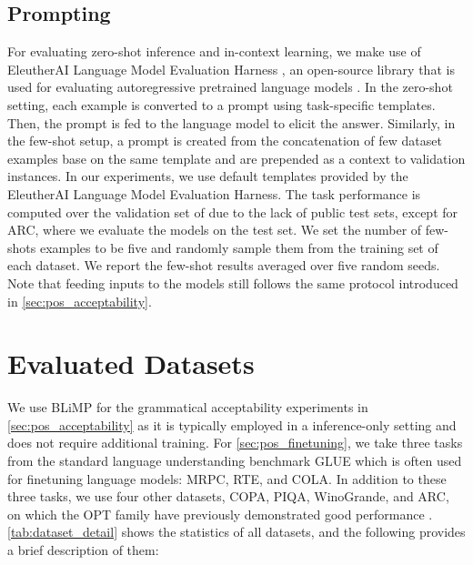 \documentclass[letterpaper, 12pt]{report}
\begin{document}
\subsection{Prompting}
\label{sec:pos_prompting}
For evaluating zero-shot inference and in-context learning, we make use of EleutherAI Language Model Evaluation Harness \citep{lm-eval-harness}, an open-source library that is used for evaluating autoregressive pretrained language models \citep{Black2022:GPTNeoX}.
In the zero-shot setting, each example is converted to a prompt using task-specific templates. Then, the prompt is fed to the language model to elicit the answer. Similarly, in the few-shot setup, a prompt is created from the concatenation of few dataset examples base on the same template and are prepended as a context to validation instances.
In our experiments, we use default templates provided by the EleutherAI Language Model Evaluation Harness. The task performance is computed over the validation set of due to the lack of public test sets, except for ARC, where we evaluate the models on the test set.
We set the number of few-shots examples to be five and randomly sample them from the training set of each dataset. We report the few-shot results averaged over five random seeds. Note that feeding inputs to the models still follows the same protocol introduced in \autoref{sec:pos_acceptability}.


% 

\section{Evaluated Datasets}
\label{sec:pos_evaluated_datasets}



We use BLiMP \citep{warstadt-etal-2020-BLiMP-benchmark} for the grammatical acceptability experiments in \autoref{sec:pos_acceptability} as it is typically employed in a inference-only setting and does not require additional training. For \autoref{sec:pos_finetuning}, we take three tasks from the standard language understanding benchmark GLUE \citep{Wang2018:GLUE} which is often used for finetuning language models: MRPC, RTE, and COLA. In addition to these three tasks, we use four other datasets, COPA, PIQA, WinoGrande, and ARC, on which the OPT family have previously demonstrated good performance \cite{Zhang2022:OPT}. \autoref{tab:dataset_detail} shows the statistics of all datasets, and the following provides a brief description of them:
\end{document}
